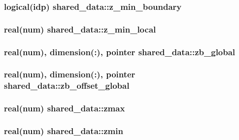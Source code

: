 \subsubsection[{\texorpdfstring{z\+\_\+min\+\_\+boundary}{z_min_boundary}}]{\setlength{\rightskip}{0pt plus 5cm}logical(idp) shared\+\_\+data\+::z\+\_\+min\+\_\+boundary}\hypertarget{namespaceshared__data_aaa333d54e2048c0199124fa66e0c460e}{}\label{namespaceshared__data_aaa333d54e2048c0199124fa66e0c460e}
\subsubsection[{\texorpdfstring{z\+\_\+min\+\_\+local}{z_min_local}}]{\setlength{\rightskip}{0pt plus 5cm}real(num) shared\+\_\+data\+::z\+\_\+min\+\_\+local}\hypertarget{namespaceshared__data_a1fb130b65ef2a707c1a79f91089e7dc0}{}\label{namespaceshared__data_a1fb130b65ef2a707c1a79f91089e7dc0}
\subsubsection[{\texorpdfstring{zb\+\_\+global}{zb_global}}]{\setlength{\rightskip}{0pt plus 5cm}real(num), dimension(\+:), pointer shared\+\_\+data\+::zb\+\_\+global}\hypertarget{namespaceshared__data_afd2142e5ba5165c1826ad1826cb061e3}{}\label{namespaceshared__data_afd2142e5ba5165c1826ad1826cb061e3}
\subsubsection[{\texorpdfstring{zb\+\_\+offset\+\_\+global}{zb_offset_global}}]{\setlength{\rightskip}{0pt plus 5cm}real(num), dimension(\+:), pointer shared\+\_\+data\+::zb\+\_\+offset\+\_\+global}\hypertarget{namespaceshared__data_afbe25de83b836cecc5e144cdee8fbb3e}{}\label{namespaceshared__data_afbe25de83b836cecc5e144cdee8fbb3e}
\subsubsection[{\texorpdfstring{zmax}{zmax}}]{\setlength{\rightskip}{0pt plus 5cm}real(num) shared\+\_\+data\+::zmax}\hypertarget{namespaceshared__data_aff54734070a6327d11c386fed6a31878}{}\label{namespaceshared__data_aff54734070a6327d11c386fed6a31878}
\subsubsection[{\texorpdfstring{zmin}{zmin}}]{\setlength{\rightskip}{0pt plus 5cm}real(num) shared\+\_\+data\+::zmin}\hypertarget{namespaceshared__data_aa449f330a5cea14b12af9b1a68766626}{}\label{namespaceshared__data_aa449f330a5cea14b12af9b1a68766626}
